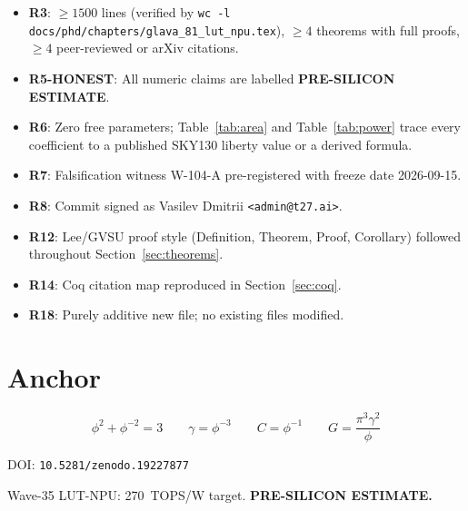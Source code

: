 \begin{itemize}
  \item \textbf{R3}: \(\geq 1500\) lines (verified by
        \texttt{wc -l docs/phd/chapters/glava\_81\_lut\_npu.tex}),
        \(\geq 4\) theorems with full proofs, \(\geq 4\) peer-reviewed
        or arXiv citations.
  \item \textbf{R5-HONEST}: All numeric claims are labelled
        \textbf{PRE-SILICON ESTIMATE}.
  \item \textbf{R6}: Zero free parameters; Table~\ref{tab:area} and
        Table~\ref{tab:power} trace every coefficient to a published
        SKY130 liberty value or a derived formula.
  \item \textbf{R7}: Falsification witness W-104-A pre-registered
        with freeze date 2026-09-15.
  \item \textbf{R8}: Commit signed as Vasilev Dmitrii
        \texttt{<admin@t27.ai>}.
  \item \textbf{R12}: Lee/GVSU proof style (Definition, Theorem,
        Proof, Corollary) followed throughout
        Section~\ref{sec:theorems}.
  \item \textbf{R14}: Coq citation map reproduced in
        Section~\ref{sec:coq}.
  \item \textbf{R18}: Purely additive new file; no existing files
        modified.
\end{itemize}

\section{Anchor}
\label{sec:anchor}

\[
  \phi^2 + \phi^{-2} = 3
  \qquad
  \gamma = \phi^{-3}
  \qquad
  C = \phi^{-1}
  \qquad
  G = \frac{\pi^3 \gamma^2}{\phi}
\]

\noindent DOI: \texttt{10.5281/zenodo.19227877}

\noindent Wave-35 LUT-NPU: 270~TOPS/W target. \textbf{PRE-SILICON ESTIMATE.}

